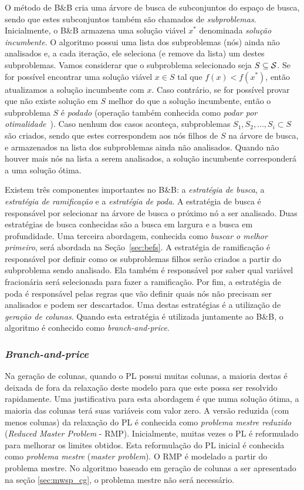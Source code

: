 O método de B\&B cria uma árvore de busca de subconjuntos do espaço de busca, sendo que estes subconjuntos também são chamados de \emph{subproblemas}. Inicialmente, o B\&B armazena uma solução viável $x^*$ denominada \emph{solução incumbente}.  O algoritmo possui uma lista dos subproblemas (nós) ainda não analisados e, a cada iteração, ele seleciona (e remove da lista) um destes subproblemas.  Vamos considerar que o subproblema selecionado seja $S \subseteq \mathcal{S}$. Se for possível encontrar uma solução viável $x \in S$ tal que $f(x) < f(x^*)$, então atualizamos a solução incumbente com $x$. Caso contrário, se for possível provar que não existe solução em $S$ melhor do que a solução incumbente, então o subproblema $S$ é \emph{podado} (operação também conhecida como \emph{podar por otimalidade}~\cite{Wolsey1998}). Caso nenhum dos casos aconteça, subproblemas $S_1, S_2, ..., S_i \subset S$ são criados, sendo que estes correspondem aos nós filhos de $S$ na árvore de busca, e armazenados na lista dos subproblemas ainda não analisados. Quando não houver mais nós na lista a serem analisados, a solução incumbente corresponderá a uma solução ótima.

Existem três componentes importantes no B\&B: a \emph{estratégia de busca},
a \emph{estratégia de ramificação} e a \emph{estratégia de poda}.
A estratégia de busca é responsável por selecionar na árvore de busca o
próximo nó a ser analisado. Duas estratégias de busca conhecidas
são a busca em largura e a busca em profundidade. Uma terceira abordagem,
conhecida como \emph{buscar o melhor primeiro}, será abordada na
Seção~\ref{sec:befs}. A estratégia de ramificação é responsável por definir
como os subproblemas filhos serão criados a partir do subproblema sendo
analisado. Ela também é responsável por saber qual variável fracionária
será selecionada para fazer a ramificação.
Por fim, a estratégia de poda é responsável pelas regras que
vão definir quais nós não precisam ser analisados e podem
ser descartados. Uma destas estratégias é a utilização de
\emph{geração de colunas}. Quando esta estratégia é utilizada juntamente ao
B\&B, o algoritmo é conhecido como \emph{branch-and-price}.

\subsubsection{\emph{Branch-and-price}}
Na geração de colunas, quando o PL  possui muitas
colunas, a maioria destas é deixada de fora da relaxação deste
modelo para que este possa ser resolvido rapidamente. Uma justificativa
para esta abordagem é que numa solução ótima, a maioria das colunas terá 
suas variáveis com valor zero. A versão reduzida (com menos colunas) da
relaxação do PL é conhecida como \emph{problema mestre reduzido}
(\emph{Reduced Master Problem} - RMP). Inicialmente, muitas vezes o PL
é reformulado para melhorar os limites obtidos. Esta reformulação do PL
inicial é conhecida como \emph{problema mestre} (\emph{master problem}).
O RMP é modelado a partir do problema mestre. No algoritmo baseado em
geração de colunas a ser apresentado na seção \ref{sec:mwsp_cg}, o problema
mestre não será necessário.

